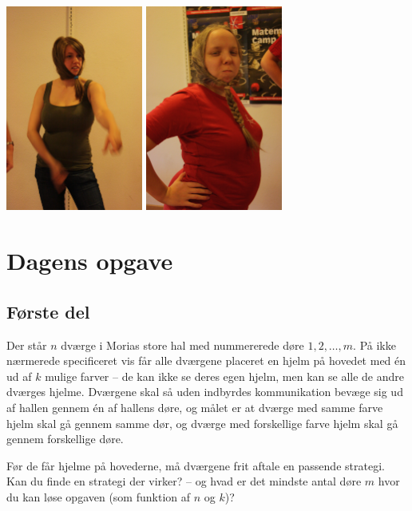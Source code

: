 \begin{minipage}[t]{100mm}
\vspace{3mm}
\includegraphics[width=45mm]{asv.jpg}
\includegraphics[width=45mm]{abr.jpg}


\section*{Dagens opgave}
\subsection*{Første del}
Der står $n$ dværge i Morias store hal med nummererede døre $1,2,\dotsc,m$. På ikke nærmerede specificeret vis får alle dværgene placeret en hjelm på hovedet med én ud af $k$ mulige farver -- de kan ikke se deres egen hjelm, men kan se alle de andre dværges hjelme. Dværgene skal så uden indbyrdes kommunikation bevæge sig ud af hallen gennem én af hallens døre, og målet er at dværge med samme farve hjelm skal gå gennem samme dør, og dværge med forskellige farve hjelm skal gå gennem forskellige døre.
 
Før de får hjelme på hovederne, må dværgene frit aftale en passende strategi. Kan du finde en strategi der virker? -- og hvad er det mindste antal døre $m$ hvor du kan løse opgaven (som funktion af $n$ og $k$)?


\end{minipage}
